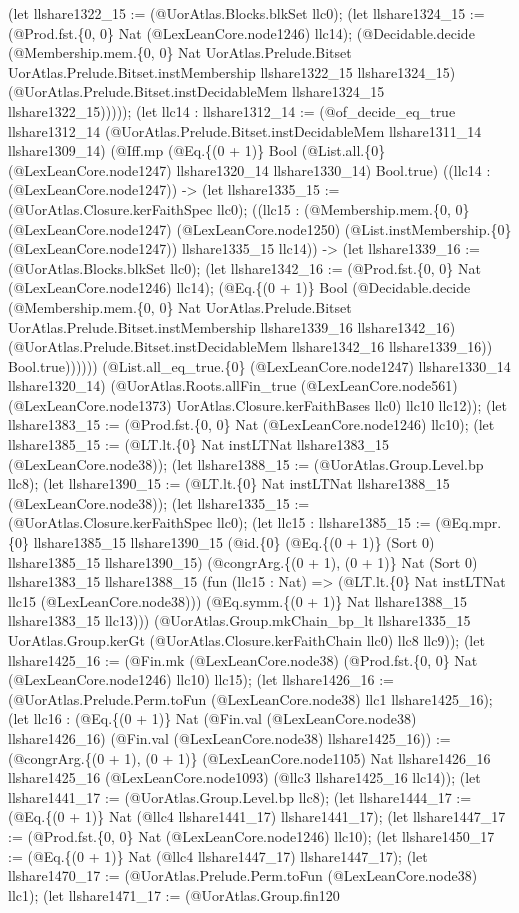 \documentclass[11pt]{article}
\begin{document}
(let llshare1322\_15 := (@UorAtlas.Blocks.blkSet llc0); (let llshare1324\_15 := (@Prod.fst.\{0, 0\} Nat (@LexLeanCore.node1246) llc14); (@Decidable.decide (@Membership.mem.\{0, 0\} Nat UorAtlas.Prelude.Bitset UorAtlas.Prelude.Bitset.instMembership llshare1322\_15 llshare1324\_15) (@UorAtlas.Prelude.Bitset.instDecidableMem llshare1324\_15 llshare1322\_15))))); (let llc14 : llshare1312\_14 := (@of\_decide\_eq\_true llshare1312\_14 (@UorAtlas.Prelude.Bitset.instDecidableMem llshare1311\_14 llshare1309\_14) (@Iff.mp (@Eq.\{(0 + 1)\} Bool (@List.all.\{0\} (@LexLeanCore.node1247) llshare1320\_14 llshare1330\_14) Bool.true) ((llc14 : (@LexLeanCore.node1247)) -> (let llshare1335\_15 := (@UorAtlas.Closure.kerFaithSpec llc0); ((llc15 : (@Membership.mem.\{0, 0\} (@LexLeanCore.node1247) (@LexLeanCore.node1250) (@List.instMembership.\{0\} (@LexLeanCore.node1247)) llshare1335\_15 llc14)) -> (let llshare1339\_16 := (@UorAtlas.Blocks.blkSet llc0); (let llshare1342\_16 := (@Prod.fst.\{0, 0\} Nat (@LexLeanCore.node1246) llc14); (@Eq.\{(0 + 1)\} Bool (@Decidable.decide (@Membership.mem.\{0, 0\} Nat UorAtlas.Prelude.Bitset UorAtlas.Prelude.Bitset.instMembership llshare1339\_16 llshare1342\_16) (@UorAtlas.Prelude.Bitset.instDecidableMem llshare1342\_16 llshare1339\_16)) Bool.true)))))) (@List.all\_eq\_true.\{0\} (@LexLeanCore.node1247) llshare1330\_14 llshare1320\_14) (@UorAtlas.Roots.allFin\_true (@LexLeanCore.node561) (@LexLeanCore.node1373) UorAtlas.Closure.kerFaithBases llc0) llc10 llc12)); (let llshare1383\_15 := (@Prod.fst.\{0, 0\} Nat (@LexLeanCore.node1246) llc10); (let llshare1385\_15 := (@LT.lt.\{0\} Nat instLTNat llshare1383\_15 (@LexLeanCore.node38)); (let llshare1388\_15 := (@UorAtlas.Group.Level.bp llc8); (let llshare1390\_15 := (@LT.lt.\{0\} Nat instLTNat llshare1388\_15 (@LexLeanCore.node38)); (let llshare1335\_15 := (@UorAtlas.Closure.kerFaithSpec llc0); (let llc15 : llshare1385\_15 := (@Eq.mpr.\{0\} llshare1385\_15 llshare1390\_15 (@id.\{0\} (@Eq.\{(0 + 1)\} (Sort 0) llshare1385\_15 llshare1390\_15) (@congrArg.\{(0 + 1), (0 + 1)\} Nat (Sort 0) llshare1383\_15 llshare1388\_15 (fun (llc15 : Nat) => (@LT.lt.\{0\} Nat instLTNat llc15 (@LexLeanCore.node38))) (@Eq.symm.\{(0 + 1)\} Nat llshare1388\_15 llshare1383\_15 llc13))) (@UorAtlas.Group.mkChain\_bp\_lt llshare1335\_15 UorAtlas.Group.kerGt (@UorAtlas.Closure.kerFaithChain llc0) llc8 llc9)); (let llshare1425\_16 := (@Fin.mk (@LexLeanCore.node38) (@Prod.fst.\{0, 0\} Nat (@LexLeanCore.node1246) llc10) llc15); (let llshare1426\_16 := (@UorAtlas.Prelude.Perm.toFun (@LexLeanCore.node38) llc1 llshare1425\_16); (let llc16 : (@Eq.\{(0 + 1)\} Nat (@Fin.val (@LexLeanCore.node38) llshare1426\_16) (@Fin.val (@LexLeanCore.node38) llshare1425\_16)) := (@congrArg.\{(0 + 1), (0 + 1)\} (@LexLeanCore.node1105) Nat llshare1426\_16 llshare1425\_16 (@LexLeanCore.node1093) (@llc3 llshare1425\_16 llc14)); (let llshare1441\_17 := (@UorAtlas.Group.Level.bp llc8); (let llshare1444\_17 := (@Eq.\{(0 + 1)\} Nat (@llc4 llshare1441\_17) llshare1441\_17); (let llshare1447\_17 := (@Prod.fst.\{0, 0\} Nat (@LexLeanCore.node1246) llc10); (let llshare1450\_17 := (@Eq.\{(0 + 1)\} Nat (@llc4 llshare1447\_17) llshare1447\_17); (let llshare1470\_17 := (@UorAtlas.Prelude.Perm.toFun (@LexLeanCore.node38) llc1); (let llshare1471\_17 := (@UorAtlas.Group.fin120 
\end{document}
